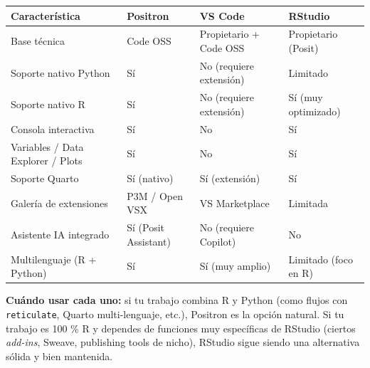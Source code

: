 \documentclass[
  doc,
  floatsintext,
  longtable,
  a4paper,
  nolmodern,
  notxfonts,
  notimes,
  12pt,
  colorlinks=true,linkcolor=blue,citecolor=blue,urlcolor=blue]{apa7}
\newcounter{none} %
\begin{document}
{\def\LTcaptype{none} %
\begin{longtable}[]{@{}
  >{\raggedright\arraybackslash}p{}
  >{\raggedright\arraybackslash}p{}
  >{\raggedright\arraybackslash}p{}
  >{\raggedright\arraybackslash}p{}@{}}
\toprule\noalign{}
\begin{minipage}[b]{\linewidth}\raggedright
Característica
\end{minipage} & \begin{minipage}[b]{\linewidth}\raggedright
Positron
\end{minipage} & \begin{minipage}[b]{\linewidth}\raggedright
VS Code
\end{minipage} & \begin{minipage}[b]{\linewidth}\raggedright
RStudio
\end{minipage} \\
\midrule\noalign{}
\endhead
\bottomrule\noalign{}
\endlastfoot
Base técnica & Code OSS & Propietario + Code OSS & Propietario
(Posit) \\
Soporte nativo Python & Sí & No (requiere extensión) & Limitado \\
Soporte nativo R & Sí & No (requiere extensión) & Sí (muy optimizado) \\
Consola interactiva & Sí & No & Sí \\
Variables / Data Explorer / Plots & Sí & No & Sí \\
Soporte Quarto & Sí (nativo) & Sí (extensión) & Sí \\
Galería de extensiones & P3M / Open VSX & VS Marketplace & Limitada \\
Asistente IA integrado & Sí (Posit Assistant) & No (requiere Copilot) &
No \\
Multilenguaje (R + Python) & Sí & Sí (muy amplio) & Limitado (foco en
R) \\
\end{longtable}
}

\textbf{Cuándo usar cada uno:} si tu trabajo combina R y Python (como
flujos con \texttt{reticulate}, Quarto multi-lenguaje, etc.), Positron
es la opción natural. Si tu trabajo es 100 \% R y dependes de funciones
muy específicas de RStudio (ciertos \emph{add-ins}, Sweave, publishing
tools de nicho), RStudio sigue siendo una alternativa sólida y bien
mantenida.
\end{document}
